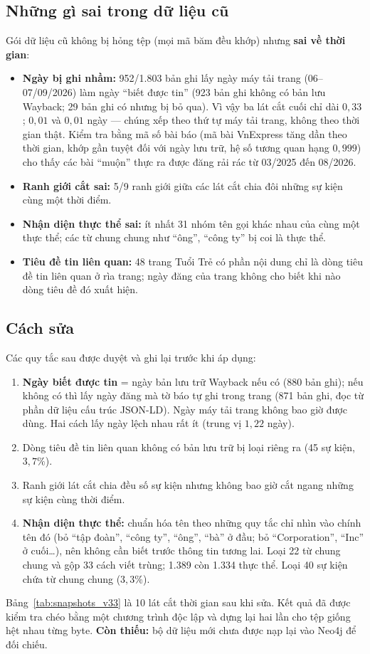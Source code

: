 \subsection{Những gì sai trong dữ liệu cũ}
Gói dữ liệu cũ không bị hỏng tệp (mọi mã băm đều khớp) nhưng \textbf{sai về thời gian}:
\begin{itemize}
    \item \textbf{Ngày bị ghi nhầm:} 952/1.803 bản ghi lấy ngày máy tải trang (06--07/09/2026) làm ngày ``biết được tin'' (923 bản ghi không có bản lưu Wayback; 29 bản ghi có nhưng bị bỏ qua). Vì vậy ba lát cắt cuối chỉ dài $0{,}33$; $0{,}01$ và $0{,}01$ ngày --- chúng xếp theo thứ tự máy tải trang, không theo thời gian thật. Kiểm tra bằng mã số bài báo (mã bài VnExpress tăng dần theo thời gian, khớp gần tuyệt đối với ngày lưu trữ, hệ số tương quan hạng $0{,}999$) cho thấy các bài ``muộn'' thực ra được đăng rải rác từ 03/2025 đến 08/2026.
    \item \textbf{Ranh giới cắt sai:} 5/9 ranh giới giữa các lát cắt chia đôi những sự kiện cùng một thời điểm.
    \item \textbf{Nhận diện thực thể sai:} ít nhất 31 nhóm tên gọi khác nhau của cùng một thực thể; các từ chung chung như ``ông'', ``công ty'' bị coi là thực thể.
    \item \textbf{Tiêu đề tin liên quan:} 48 trang Tuổi Trẻ có phần nội dung chỉ là dòng tiêu đề tin liên quan ở rìa trang; ngày đăng của trang không cho biết khi nào dòng tiêu đề đó xuất hiện.
\end{itemize}

\subsection{Cách sửa}
Các quy tắc sau được duyệt và ghi lại trước khi áp dụng:
\begin{enumerate}
    \item \textbf{Ngày biết được tin} = ngày bản lưu trữ Wayback nếu có (880 bản ghi); nếu không có thì lấy ngày đăng mà tờ báo tự ghi trong trang (871 bản ghi, đọc từ phần dữ liệu cấu trúc JSON-LD). Ngày máy tải trang không bao giờ được dùng. Hai cách lấy ngày lệch nhau rất ít (trung vị $1{,}22$ ngày).
    \item Dòng tiêu đề tin liên quan không có bản lưu trữ bị loại riêng ra (45 sự kiện, $3{,}7\%$).
    \item Ranh giới lát cắt chia đều số sự kiện nhưng không bao giờ cắt ngang những sự kiện cùng thời điểm.
    \item \textbf{Nhận diện thực thể:} chuẩn hóa tên theo những quy tắc chỉ nhìn vào chính tên đó (bỏ ``tập đoàn'', ``công ty'', ``ông'', ``bà'' ở đầu; bỏ ``Corporation'', ``Inc'' ở cuối\ldots), nên không cần biết trước thông tin tương lai. Loại 22 từ chung chung và gộp 33 cách viết trùng; 1.389 còn 1.334 thực thể. Loại 40 sự kiện chứa từ chung chung ($3{,}3\%$).
\end{enumerate}
Bảng~\ref{tab:snapshots_v33} là 10 lát cắt thời gian sau khi sửa. Kết quả đã được kiểm tra chéo bằng một chương trình độc lập và dựng lại hai lần cho tệp giống hệt nhau từng byte. \textbf{Còn thiếu:} bộ dữ liệu mới chưa được nạp lại vào Neo4j để đối chiếu.

